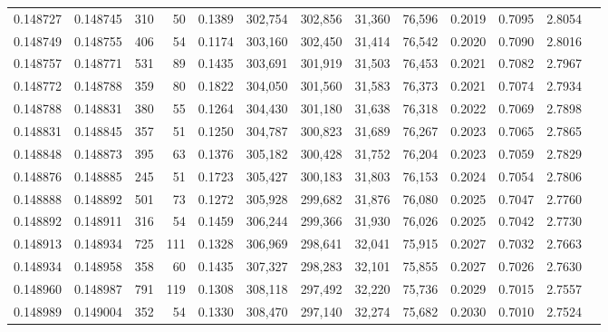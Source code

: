 \begin{tabular}{rrrrrrrrrrrrr}
0.148727 & 0.148745 &   310 &  50 &                                     0.1389 & 302,754 & 302,856 &  31,360 &  76,596 & 0.2019 & 0.7095 & 2.8054 \\
0.148749 & 0.148755 &   406 &  54 &                                     0.1174 & 303,160 & 302,450 &  31,414 &  76,542 & 0.2020 & 0.7090 & 2.8016 \\
0.148757 & 0.148771 &   531 &  89 &                                     0.1435 & 303,691 & 301,919 &  31,503 &  76,453 & 0.2021 & 0.7082 & 2.7967 \\
0.148772 & 0.148788 &   359 &  80 &                                     0.1822 & 304,050 & 301,560 &  31,583 &  76,373 & 0.2021 & 0.7074 & 2.7934 \\
0.148788 & 0.148831 &   380 &  55 &                                     0.1264 & 304,430 & 301,180 &  31,638 &  76,318 & 0.2022 & 0.7069 & 2.7898 \\
0.148831 & 0.148845 &   357 &  51 &                                     0.1250 & 304,787 & 300,823 &  31,689 &  76,267 & 0.2023 & 0.7065 & 2.7865 \\
0.148848 & 0.148873 &   395 &  63 &                                     0.1376 & 305,182 & 300,428 &  31,752 &  76,204 & 0.2023 & 0.7059 & 2.7829 \\
0.148876 & 0.148885 &   245 &  51 &                                     0.1723 & 305,427 & 300,183 &  31,803 &  76,153 & 0.2024 & 0.7054 & 2.7806 \\
0.148888 & 0.148892 &   501 &  73 &                                     0.1272 & 305,928 & 299,682 &  31,876 &  76,080 & 0.2025 & 0.7047 & 2.7760 \\
0.148892 & 0.148911 &   316 &  54 &                                     0.1459 & 306,244 & 299,366 &  31,930 &  76,026 & 0.2025 & 0.7042 & 2.7730 \\
0.148913 & 0.148934 &   725 & 111 &                                     0.1328 & 306,969 & 298,641 &  32,041 &  75,915 & 0.2027 & 0.7032 & 2.7663 \\
0.148934 & 0.148958 &   358 &  60 &                                     0.1435 & 307,327 & 298,283 &  32,101 &  75,855 & 0.2027 & 0.7026 & 2.7630 \\
0.148960 & 0.148987 &   791 & 119 &                                     0.1308 & 308,118 & 297,492 &  32,220 &  75,736 & 0.2029 & 0.7015 & 2.7557 \\
0.148989 & 0.149004 &   352 &  54 &                                     0.1330 & 308,470 & 297,140 &  32,274 &  75,682 & 0.2030 & 0.7010 & 2.7524 \\

\end{tabular}
